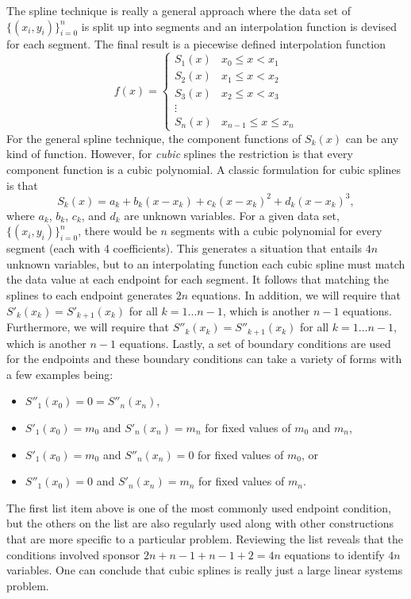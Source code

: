 \documentclass[twoside]{article}
\def\ds{\displaystyle}
\begin{document}
The spline technique is really a general approach where the data set of $\ds \{(x_i,y_i)\}_{i=0}^n$ is split up into segments and an interpolation function is devised for each segment. The final result is a piecewise defined interpolation function 
$$f(x) = \begin{cases} S_1(x) & x_0\le x < x_1 \\ 
S_2(x) & x_1 \le x < x_2 \\
S_3(x) & x_2 \le x < x_3 \\
\vdots \\
S_n(x) & x_{n-1} \le x \le x_n 
\end{cases}$$
For the general spline technique, the component functions of $\ds S_k(x)$ can be any kind of function. However, for {\it cubic} splines the restriction is that every component function is a cubic polynomial. A classic formulation for cubic splines is that 
$$S_k(x) = a_k + b_k(x-x_k) + c_k(x-x_k)^2 + d_k(x-x_k)^3, $$
where $\ds a_k$, $\ds b_k$, $\ds c_k$, and $\ds d_k$ are unknown variables. For a given data set,  $\ds \{(x_i,y_i)\}_{i=0}^n$, there would be $n$ segments with a cubic polynomial for every segment (each with 4 coefficients). This generates a situation that entails $4n$ unknown variables, but to an interpolating function each cubic spline must match the data value at each endpoint for each segment. It follows that matching the splines to each endpoint generates $2n$ equations. In addition, we will require that 
$\ds S'_k(x_k) = S'_{k+1}(x_k)$ for all $k = 1 ... n-1$, which is another $n-1$ equations. Furthermore, we will require that $\ds S''_k(x_k) = S''_{k+1}(x_k)$ for all $k = 1 ... n-1$, which is another $n-1$ equations. Lastly, a set of boundary conditions are used for the endpoints and these boundary conditions can take a variety of forms with a few examples being:
\begin{itemize}
    \item $\ds S''_1(x_0) = 0 =  S''_{n}(x_n)$,
    \item  $\ds S'_1(x_0) = m_0$ and $\ds   S'_{n}(x_n)=m_n$ for fixed values of $\ds m_0$ and $\ds m_n$,
    \item  $\ds S'_1(x_0) = m_0$ and $\ds   S''_{n}(x_n)=0$ for fixed values of $\ds m_0$, or
    \item  $\ds S''_1(x_0) = 0$ and $\ds   S'_{n}(x_n)=m_n$ for fixed values of $\ds m_n$.
\end{itemize}
The first list item above is one of the most commonly used endpoint condition, but the others on the list are also regularly used along with other constructions that are more specific to a particular problem. Reviewing the list reveals that the conditions involved sponsor $2n + n-1 + n-1 + 2 = 4n$ equations to identify $4n$ variables. One can conclude that cubic splines is really just a large linear systems problem. 
\end{document}
